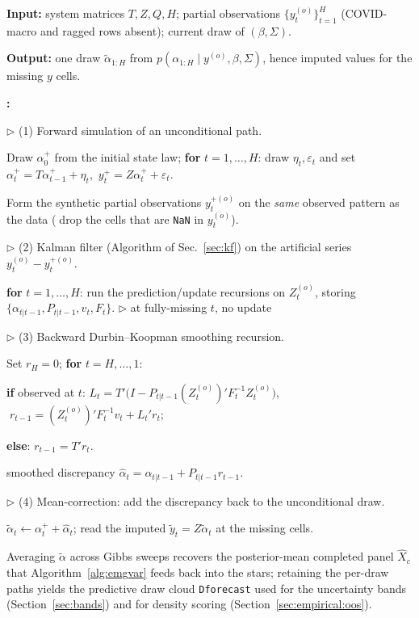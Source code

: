 \documentclass[11pt]{article}
\newcounter{algstep}
\newenvironment{algsteps}
  {\begin{list}{\textbf{\arabic{algstep}:}}{\usecounter{algstep}%
     \setlength{\leftmargin}{2.0em}\setlength{\labelwidth}{1.6em}%
     \setlength{\itemsep}{1.5pt}\setlength{\parsep}{0pt}%
     \setlength{\topsep}{2pt}}}
  {\end{list}}
\newcommand{\algIn}[1]{\noindent\textbf{Input:} #1\par\vspace{1pt}}
\newcommand{\algOut}[1]{\noindent\textbf{Output:} #1\par\vspace{1pt}}
\newcommand{\algInd}{\hspace*{1.4em}}
\newcommand{\algKw}[1]{\textbf{#1}}
\newcommand{\algComment}[1]{{\color{black!55}\(\triangleright\) #1}}
\theoremstyle{definition}
\theoremstyle{remark}
\begin{document}
\begin{algorithm}[!ht]
\caption{Durbin--Koopman simulation smoother with partial observations
(one draw inside the data-augmentation Gibbs sweep).}
\label{alg:dksmoother}
\algIn{system matrices $T,Z,Q,H$; partial observations
$\{y_t^{(o)}\}_{t=1}^{H}$ (COVID-macro and ragged rows absent);
current draw of $(\beta,\Sigma)$.}
\algOut{one draw $\tilde\alpha_{1:H}$ from $p(\alpha_{1:H}\mid y^{(o)},\beta,\Sigma)$, hence imputed values for the missing $y$ cells.}
\begin{algsteps}
\item \algComment{(1) Forward simulation of an unconditional path.}
\item Draw $\alpha_0^{+}$ from the initial state law; \algKw{for} $t=1,\dots,H$: draw $\eta_t,\varepsilon_t$ and set $\alpha_t^{+}=T\alpha_{t-1}^{+}+\eta_t$, $\,y_t^{+}=Z\alpha_t^{+}+\varepsilon_t$.
\item Form the synthetic partial observations $y_t^{+(o)}$ on the \emph{same} observed pattern as the data ($\;$drop the cells that are \texttt{NaN} in $y_t^{(o)}$).
\item \algComment{(2) Kalman filter (Algorithm of Sec.~\ref{sec:kf}) on the artificial series $y_t^{(o)}-y_t^{+(o)}$.}
\item \algKw{for} $t=1,\dots,H$: run the prediction/update recursions on $Z_t^{(o)}$, storing $\{\alpha_{t|t-1},P_{t|t-1},v_t,F_t\}$. \algComment{at fully-missing $t$, no update}
\item \algComment{(3) Backward Durbin--Koopman smoothing recursion.}
\item Set $r_H=0$; \algKw{for} $t=H,\dots,1$:
\item \algInd \algKw{if} observed at $t$: $L_t = T'\bigl(I - P_{t|t-1}(Z_t^{(o)})'F_t^{-1}Z_t^{(o)}\bigr)$, $\;r_{t-1}=(Z_t^{(o)})'F_t^{-1}v_t + L_t'r_t$;
\item \algInd \algKw{else}: $r_{t-1}=T'r_t$.
\item \algInd smoothed discrepancy $\hat\alpha_t = \alpha_{t|t-1}+P_{t|t-1}r_{t-1}$.
\item \algComment{(4) Mean-correction: add the discrepancy back to the unconditional draw.}
\item $\tilde\alpha_t \gets \alpha_t^{+} + \hat\alpha_t$; read the imputed $\tilde y_t = Z\tilde\alpha_t$ at the missing cells.
\end{algsteps}
\end{algorithm}

Averaging $\tilde\alpha$ across Gibbs sweeps recovers the posterior-mean
completed panel $\widehat X_c$ that Algorithm~\ref{alg:emgvar} feeds back
into the stars; retaining the per-draw paths yields the predictive draw
cloud \texttt{Dforecast} used for the uncertainty bands
(Section~\ref{sec:bands}) and for density scoring
(Section~\ref{sec:empirical:oos}).
\end{document}
